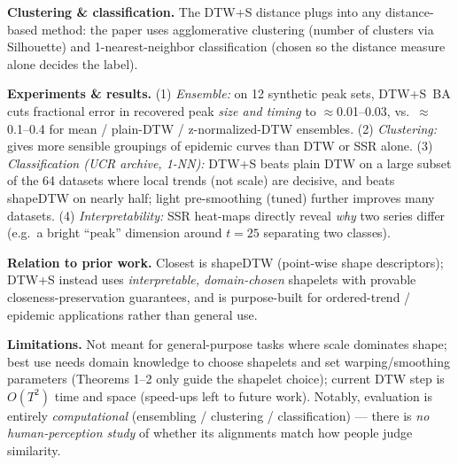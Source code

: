 \documentclass[10pt]{article}
\newcommand{\head}[1]{\smallskip\noindent\textbf{#1}\quad}
\begin{document}
\head{Clustering \& classification.} The DTW+S distance plugs into any distance-based method: the
paper uses agglomerative clustering (number of clusters via Silhouette) and 1-nearest-neighbor
classification (chosen so the distance measure alone decides the label).

\head{Experiments \& results.} (1) \emph{Ensemble:} on 12 synthetic peak sets, DTW+S~BA cuts
fractional error in recovered peak \emph{size and timing} to $\approx$0.01--0.03, vs.\ $\approx$0.1--0.4
for mean / plain-DTW / z-normalized-DTW ensembles. (2) \emph{Clustering:} gives more sensible groupings
of epidemic curves than DTW or SSR alone. (3) \emph{Classification (UCR archive, 1-NN):} DTW+S beats
plain DTW on a large subset of the 64 datasets where local trends (not scale) are decisive, and beats
shapeDTW on nearly half; light pre-smoothing (tuned) further improves many datasets. (4)
\emph{Interpretability:} SSR heat-maps directly reveal \emph{why} two series differ (e.g.\ a bright
``peak'' dimension around $t\!=\!25$ separating two classes).

\head{Relation to prior work.} Closest is shapeDTW (point-wise shape descriptors); DTW+S instead uses
\emph{interpretable, domain-chosen} shapelets with provable closeness-preservation guarantees, and is
purpose-built for ordered-trend / epidemic applications rather than general use.

\head{Limitations.} Not meant for general-purpose tasks where scale dominates shape; best use needs
domain knowledge to choose shapelets and set warping/smoothing parameters (Theorems 1--2 only guide the
shapelet choice); current DTW step is $O(T^2)$ time and space (speed-ups left to future work). Notably,
evaluation is entirely \emph{computational} (ensembling / clustering / classification) --- there is
\emph{no human-perception study} of whether its alignments match how people judge similarity.
\end{document}
